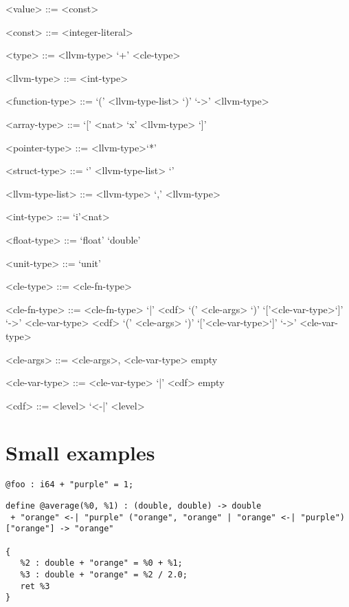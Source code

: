 \documentclass{article}
\begin{document}
\begin{grammar}
<value> ::= <const>

<const> ::= <integer-literal>

<type> ::= <llvm-type> `+' <cle-type>

<llvm-type> ::= <int-type>

<function-type> ::= `(' <llvm-type-list> `)' `->' <llvm-type>

<array-type> ::= `[' <nat> `x' <llvm-type> `]'

<pointer-type> ::= <llvm-type>`*'

<struct-type> ::= `{' <llvm-type-list> `}'

<llvm-type-list> ::= <llvm-type>
`,' <llvm-type>

<int-type> ::= `i'<nat>

<float-type> ::= `float' 
\alt `double'

<unit-type> ::= `unit'

<cle-type> ::= <cle-fn-type>  

<cle-fn-type> ::= 
    <cle-fn-type> `|' <cdf> `(' <cle-args> `)' `['<cle-var-type>`]' `->' <cle-var-type>
    \alt <cdf> `(' <cle-args> `)' `['<cle-var-type>`]' `->' <cle-var-type>


<cle-args> ::= <cle-args>, <cle-var-type> \alt empty

<cle-var-type> ::=  <cle-var-type> `|' <cdf> \alt empty 

<cdf> ::= <level> `<-|' <level> 

\end{grammar}

\section{Small examples}

\begin{verbatim}
@foo : i64 + "purple" = 1;
\end{verbatim}


\begin{verbatim}
define @average(%0, %1) : (double, double) -> double
 + "orange" <-| "purple" ("orange", "orange" | "orange" <-| "purple") ["orange"] -> "orange"  
      
{
   %2 : double + "orange" = %0 + %1;
   %3 : double + "orange" = %2 / 2.0;
   ret %3
}
\end{verbatim}
\end{document}
